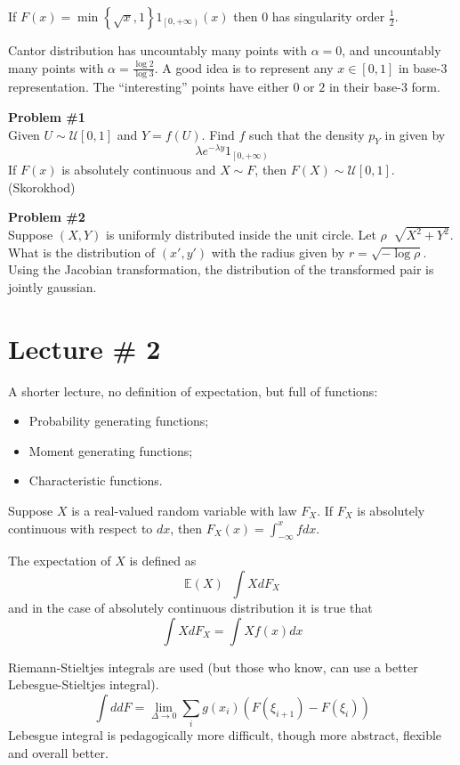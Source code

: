 \documentclass[a4paper]{article}
\newcommand{\obj}[1]{{\left\{ #1 \right \}}}
\newcommand{\clo}[1]{{\left [ #1 \right ]}}
\newcommand{\clop}[1]{{\left [ #1 \right )}}
\newcommand{\brac}[1]{{\left ( #1 \right )}}
\newcommand{\ex}{\mathbb{E}}
\newcommand{\defn}{\mathop{\overset{\Delta}{=}}\nolimits}
\begin{document}
If $F(x)=\min\obj{\sqrt{x}, 1} 1_{\clop{0,+\infty}}(x)$ then $0$ has singularity order $\frac{1}{2}$.

Cantor distribution has uncountably many points with $\alpha = 0$, and uncountably many points with $\alpha = \frac{\log 2}{\log 3}$.
A good idea is to represent any $x\in \clo{0,1}$ in base-3 representation. The ``interesting'' points have either $0$ or $2$ in their base-3 form.

\noindent\textbf{Problem \#1}\hfill \\
	Given $U\sim \mathcal{U}\clo{0,1}$ and $Y=f(U)$. Find $f$ such that the density $p_Y$ in given by
	\[\lambda e^{-\lambda y} 1_{\clop{0,+\infty}}\]
	If $F(x)$ is absolutely continuous and $X\sim F$, then $F(X)\sim \mathcal{U}\clo{0,1}$. (Skorokhod)

\noindent\textbf{Problem \#2}\hfill \\
	Suppose $(X,Y)$ is uniformly distributed inside the unit circle. Let $\rho \defn \sqrt{X^2+Y^2}$. What is the distribution of $(x',y')$ with the radius given by $r = \sqrt{-\log \rho}$.
	Using the Jacobian transformation, the distribution of the transformed pair is jointly gaussian.


\section{Lecture \# 2} %
\label{sec:lecture_2}

A shorter lecture, no definition of expectation, but full of functions:
\begin{itemize}
	\item Probability generating functions;
	\item Moment generating functions;
	\item Characteristic functions.
\end{itemize}

Suppose $X$ is a real-valued random variable with law $F_X$. If $F_X$ is absolutely continuous with respect to $dx$, then $F_X(x) = \int_{-\infty}^x f dx$.

The expectation of $X$ is defined as \[\ex(X) \defn \int X d{F_X}\] and in the case of absolutely continuous distribution it is true that \[\int X d{F_X} = \int X f(x) dx\]

Riemann-Stieltjes integrals are used (but those who know, can use a better Lebesgue-Stieltjes integral).
\[\int d dF = \lim_{\Delta\to 0} \sum_i g(x_i) \brac{F(\xi_{i+1}) - F(\xi_i)}\]
Lebesgue integral is pedagogically more difficult, though more abstract, flexible and overall better.
\end{document}
